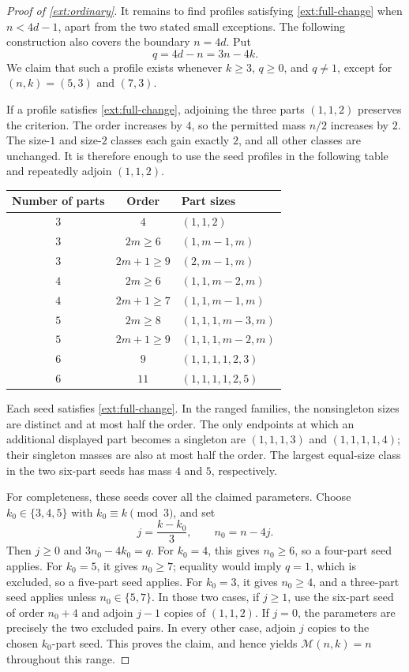 \documentclass[10pt,a4paper]{amsart}
\numberwithin{equation}{section}
\theoremstyle{definition}
\theoremstyle{remark}
\begin{document}
\begin{proof}[Proof of \cref{ext:ordinary}]
It remains to find profiles satisfying \eqref{ext:full-change} when
$n<4d-1$, apart from the two stated small exceptions.  The following
construction also covers the boundary $n=4d$.  Put
\[
 q=4d-n=3n-4k.
\]
We claim that such a profile exists whenever $k\ge3$, $q\ge0$, and
$q\ne1$, except for $(n,k)=(5,3)$ and $(7,3)$.

If a profile satisfies \eqref{ext:full-change}, adjoining the three
parts $(1,1,2)$ preserves the criterion.  The order increases by $4$,
so the permitted mass $n/2$ increases by $2$.  The size-$1$ and
size-$2$ classes each gain exactly $2$, and all other classes are
unchanged.  It is therefore enough to use the seed profiles in the
following table and repeatedly adjoin $(1,1,2)$.
\begin{center}
\begin{tabular}{ccl}
Number of parts & Order & Part sizes\\
\hline
$3$ & $4$ & $(1,1,2)$\\
$3$ & $2m\ge6$ & $(1,m-1,m)$\\
$3$ & $2m+1\ge9$ & $(2,m-1,m)$\\
$4$ & $2m\ge6$ & $(1,1,m-2,m)$\\
$4$ & $2m+1\ge7$ & $(1,1,m-1,m)$\\
$5$ & $2m\ge8$ & $(1,1,1,m-3,m)$\\
$5$ & $2m+1\ge9$ & $(1,1,1,m-2,m)$\\
$6$ & $9$ & $(1,1,1,1,2,3)$\\
$6$ & $11$ & $(1,1,1,1,2,5)$
\end{tabular}
\end{center}
Each seed satisfies \eqref{ext:full-change}.  In the ranged families,
the nonsingleton sizes are distinct and at most half the order.  The
only endpoints at which an additional displayed part becomes a
singleton are $(1,1,1,3)$ and $(1,1,1,1,4)$; their singleton masses
are also at most half the order.  The largest equal-size class in the
two six-part seeds has mass $4$ and $5$, respectively.

For completeness, these seeds cover all the claimed parameters.
Choose $k_0\in\{3,4,5\}$ with $k_0\equiv k\pmod3$, and set
\[
 j=\frac{k-k_0}{3},\qquad n_0=n-4j.
\]
Then $j\ge0$ and $3n_0-4k_0=q$.  For $k_0=4$, this gives
$n_0\ge6$, so a four-part seed applies.  For $k_0=5$, it gives
$n_0\ge7$; equality would imply $q=1$, which is excluded, so a
five-part seed applies.  For $k_0=3$, it gives $n_0\ge4$, and a
three-part seed applies unless $n_0\in\{5,7\}$.  In those two cases,
if $j\ge1$, use the six-part seed of order $n_0+4$ and adjoin
$j-1$ copies of $(1,1,2)$.  If $j=0$, the parameters are precisely
the two excluded pairs.  In every other case, adjoin $j$ copies to
the chosen $k_0$-part seed.  This proves the claim, and hence yields
$\mathcal M(n,k)=n$ throughout this range.


\end{proof}
\end{document}
